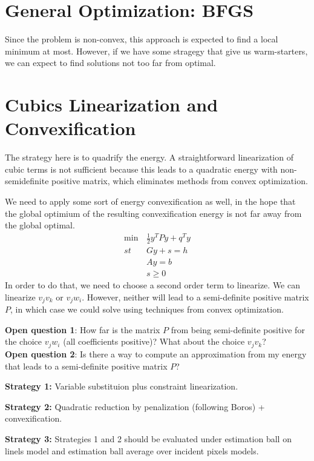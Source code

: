 \section{General Optimization: BFGS}
Since the problem is non-convex, this approach is expected to find a local minimum at most. However, if we have some stragegy that give us warm-starters, we can expect to find solutions not too far from optimal.

\section{Cubics Linearization and Convexification}
The strategy here is to quadrify the energy. A straightforward linearization of cubic terms is not sufficient because this leads to a quadratic energy with non-semidefinite positive matrix, which eliminates methods from convex optimization.

We need to apply some sort of energy convexification as well, in the hope that the global optimium of the resulting convexification energy is not far away from the global optimal.
	\begin{equation}
	\begin{aligned}
		\min &\frac{1}{2} y^TPy + q^Ty\\
		st \quad &Gy + s = h\\
		&Ay = b \\
		& s \geq 0
		\label{eq:quadratic-formulation}
	\end{aligned}
	\end{equation}
%	
	In order to do that, we need to choose a second order term to linearize. We can linearize $v_jv_k$ or $v_jw_i$. However, neither will lead to a semi-definite positive matrix $P$, in which case we could solve using techniques from convex optimization.

	\textbf{Open question 1}: How far is the matrix $P$ from being semi-definite positive for the choice $v_jw_i$ (all coefficients positive)? What about the choice $v_jv_k$? \\
		
	\textbf{Open question 2}: Is there a way to compute an approximation from my energy that leads to a semi-definite positive matrix $P$?
	
	\textbf{Strategy 1:} Variable substituion plus constraint linearization.
	
	\textbf{Strategy 2:} Quadratic reduction by penalization (following Boros) + convexification.
	
	\textbf{Strategy 3:} Strategies 1 and 2 should be evaluated under estimation ball on linels model and estimation ball average over incident pixels models.
	
